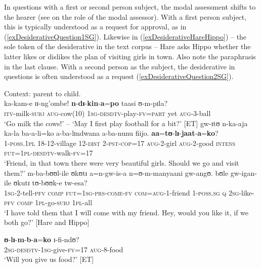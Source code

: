 In questions with a first or second person subject, the modal assessment shifts to the hearer (see \citealt{LehmannC2012} on the role of the modal assessor). With a first person subject, this is typically understood as a request for approval, as in (\ref{exDesiderativeQuestion1SG}). Likewise in (\ref{exDesiderativeHareHippo}) -- the sole token of the desiderative in the text corpus -- Hare asks Hippo whether the latter likes or dislikes the plan of visiting girls in town. Also note the paraphrasis in the last clause. With a second person as the subject, the desiderative in questions is often understood as a request (\ref{exDesiderativeQuestion2SG}). 
\begin{exe}
\ex \label{exDesiderativeQuestion1SG} Context: parent to child.\\
\gll ka-kam-e ɪɪ-ng'ombe! \textbf{n}-\textbf{dɪ}-\textbf{kin}-\textbf{a}=\textbf{po} taasi ʊ-m-pɪla?\\
\textsc{itv}-milk-\textsc{subj} \textsc{aug}-cow(10) \textsc{1sg}-\textsc{desdtv}-play-\textsc{fv}=\textsc{part} yet \textsc{aug}-3-ball\\
\glt `Go milk the cows!' -- \lq May I first play football for a bit?' [ET]
\ex \label{exDesiderativeHareHippo} \gll gw-ɪtʊ n-ka-aja ka-la ba-a-li=ko a-ba-lɪndwana a-ba-nunu fiijo. \textbf{aa}=\textbf{tʊ}-\textbf{lɪ}-\textbf{jaat}-\textbf{a}=\textbf{ko}?\\
1-\textsc{poss.1pl} 18-12-village 12-\textsc{dist} 2-\textsc{pst}-\textsc{cop}=17 \textsc{aug}-2-girl \textsc{aug}-2-good \textsc{intens} \textsc{fut}=\textsc{1pl}-\textsc{desdtv}-walk-\textsc{fv}=17\\ 
\glt `Friend, in that town there were very beautiful girls. Should we go and visit them?' 
\sn \gll  m-ba-bʊʊl-ile ʊkʊtɪ a=n-gw-is-a n=ʊ-m-manyaani gw-angʊ. bʊle gw-igan-ile ʊkutɪ tʊ-bʊʊk-e tw-esa?\\ %
\textsc{1sg}-2-tell-\textsc{pfv} \textsc{comp} \textsc{fut}=\textsc{1sg}-\textsc{prs}-\textsc{come}-\textsc{fv} \textsc{com}=\textsc{aug}-1-friend 1-\textsc{poss.sg} \textsc{q} \textsc{2sg}-like-\textsc{pfv} \textsc{comp} \textsc{1pl}-go-\textsc{subj} \textsc{1pl}-all\\
\glt \lq I have told them that I will come with my friend. Hey, would you like it, if we both go?' [Hare and Hippo]

\ex \label{exDesiderativeQuestion2SG}
\gll \textbf{ʊ}-\textbf{lɪ}-\textbf{m}-\textbf{b}-\textbf{a}=\textbf{ko} ɪ-fi-ndʊ?\\
\textsc{2sg}-\textsc{desdtv}-\textsc{1sg}-give-\textsc{fv}=17 \textsc{aug}-8-food\\
\glt \lq Will you give us food?' [ET]
\end{exe}

